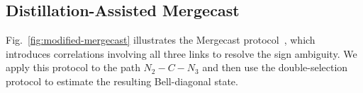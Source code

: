 





\subsection{Distillation-Assisted Mergecast}
\label{subsec:mergecast-nt}
Fig.~\ref{fig:modified-mergecast} illustrates the Mergecast
protocol~\cite{wang2025quantumnetworktomographygeneral},
which introduces correlations involving all three links
to resolve the sign ambiguity.
We apply this protocol to the path $N_2\!-\!C\!-\!N_3$
and then use the double-selection protocol to estimate
the resulting Bell-diagonal state.
